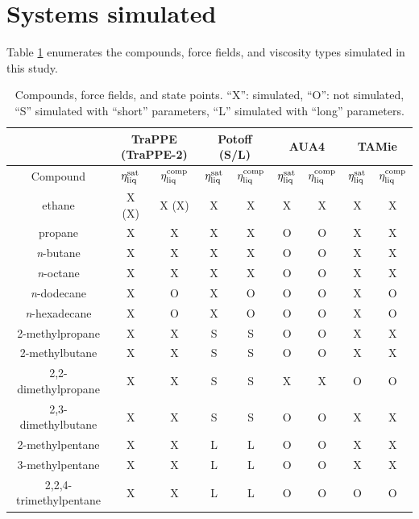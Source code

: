\documentclass[preprint,review,12pt]{elsarticle}
\begin{document}
	\newpage
	
	\section{Systems simulated} \label{Systems simulated}
	
	Table \ref{tab:simulations_performed} enumerates the compounds, force fields, and viscosity types simulated in this study.
	
	\begin{table}[h!]
		\caption{Compounds, force fields, and state points. ``X'': simulated, ``O'': not simulated, ``S'' simulated with ``short'' parameters, ``L'' simulated with ``long'' parameters.} \label{tab:simulations_performed}
		\begin{center}
			\begin{tabular}{|c|c|c|c|c|c|c|c|c|}
				\hline
				\multicolumn{1}{|c}{} & \multicolumn{2}{|c}{TraPPE (TraPPE-2)} & \multicolumn{2}{|c|}{Potoff (S/L)} & \multicolumn{2}{|c}{AUA4} & \multicolumn{2}{|c|}{TAMie}  \\ \hline
				Compound & $\eta_{\rm liq}^{\rm sat}$ & $\eta_{\rm liq}^{\rm comp}$ & $\eta_{\rm liq}^{\rm sat}$ & $\eta_{\rm liq}^{\rm comp}$ & $\eta_{\rm liq}^{\rm sat}$ & $\eta_{\rm liq}^{\rm comp}$ & $\eta_{\rm liq}^{\rm sat}$ & $\eta_{\rm liq}^{\rm comp}$ \\ \hline
				ethane & X (X) & X (X) & X & X & X & X & X & X \\ \hline
				propane & X & X & X & X & O & O & X & X \\ \hline
				\textit{n}-butane & X & X & X & X & O & O & X & X \\ \hline
				\textit{n}-octane & X & X & X & X & O & O & X & X \\ \hline
				\textit{n}-dodecane & X & O & X & O & O & O & X & O \\ \hline
				\textit{n}-hexadecane & X & O & X & O & O & O & X & O \\ \hline
				2-methylpropane & X & X & S & S & O & O & X & X \\ \hline
				2-methylbutane & X & X & S & S & O & O & X & X \\ \hline
				2,2-dimethylpropane & X & X & S & S & X & X & O & O \\ \hline
				2,3-dimethylbutane & X & X & S & S & O & O & X & X \\ \hline
				2-methylpentane & X & X & L & L & O & O & X & X \\ \hline
				3-methylpentane & X & X & L & L & O & O & X & X \\ \hline
				2,2,4-trimethylpentane & X & X & L & L & O & O & O & O \\ \hline
			\end{tabular}
		\end{center} 
	\end{table}
\end{document}

